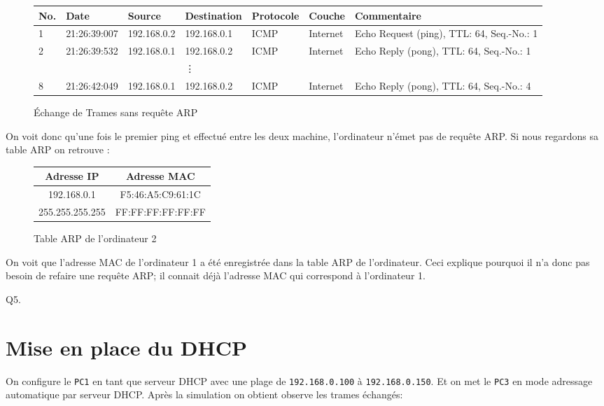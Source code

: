 \documentclass[11pt]{book}
\begin{document}
	\begin{figure}[ht!]
		\begin{tabular}{|l|l|l|l|l|l|l|}
			\hline
			No. & Date & Source & Destination & Protocole & Couche & Commentaire\\
			\hline
			1 & 21:26:39:007 & 192.168.0.2 & 192.168.0.1 & ICMP & Internet & Echo Request (ping), TTL: 64, Seq.-No.: 1\\
			\hline
			2 & 21:26:39:532 & 192.168.0.1 & 192.168.0.2 & ICMP & Internet & Echo Reply (pong), TTL: 64, Seq.-No.: 1\\
			\hline
			  & & & \vdots & & & \\
			\hline
			8 & 21:26:42:049 & 192.168.0.1 & 192.168.0.2 & ICMP & Internet & Echo Reply (pong), TTL: 64, Seq.-No.: 4\\
			\hline
			
		\end{tabular}
		\caption{Échange de Trames sans requête ARP}
	\end{figure}
	\newpage
	On voit donc qu'une fois le premier ping et effectué entre les deux machine, l'ordinateur n'émet pas de requête ARP. Si nous regardons sa table ARP on retrouve :
	\begin{figure}[ht!]
		\centering
		\begin{tabular}{|c|c|}
			\hline
			Adresse IP & Adresse MAC\\
			\hline
			192.168.0.1 & F5:46:A5:C9:61:1C\\
			\hline
			255.255.255.255 & FF:FF:FF:FF:FF:FF\\
			\hline
		\end{tabular}
		\caption{Table ARP de l'ordinateur 2}
	\end{figure}
	
	On voit que l'adresse MAC de l'ordinateur 1 a été enregistrée dans la table ARP de l'ordinateur. Ceci explique pourquoi il n'a donc pas besoin de refaire une requête ARP; il connait déjà l'adresse MAC qui correspond à l'ordinateur 1.

	Q5. 

	\section{Mise en place du DHCP}

	On configure le \texttt{PC1} en tant que serveur DHCP avec une plage de \texttt{192.168.0.100} à \texttt{192.168.0.150}. Et on met le \texttt{PC3} en mode adressage automatique par serveur DHCP. Après la simulation on obtient observe les trames échangés:
\end{document}
